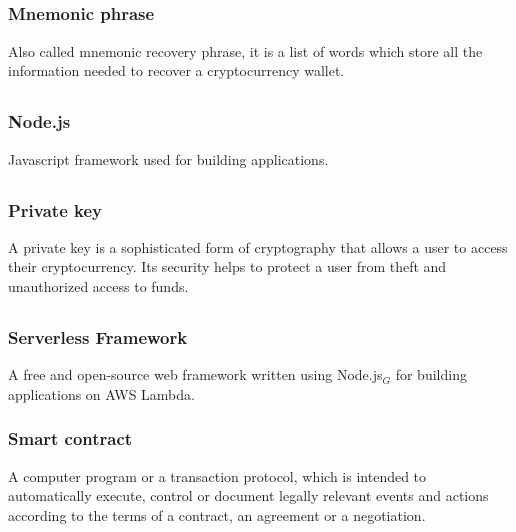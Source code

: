 			
	\subsection*{}
		\subsubsection*{Mnemonic phrase}
			Also called mnemonic recovery phrase, it is a list of words which store all the information needed to recover a cryptocurrency wallet.
	
	\subsection*{}
		\subsubsection*{Node.js}
			Javascript framework used for building applications. 
	
	\subsection*{}
		\subsubsection*{Private key}
			A private key is a sophisticated form of cryptography that allows a user to access their cryptocurrency. Its security helps to protect a user from theft and unauthorized access to funds.
	
	\subsection*{}
		\subsubsection*{Serverless Framework}
			A free and open-source web framework written using Node.js$_{G}$ for building applications on AWS Lambda.
			
		\subsubsection*{Smart contract}
			A computer program or a transaction protocol, which is intended to automatically execute, control or document legally relevant events and actions according to the terms of a contract, an agreement or a negotiation.